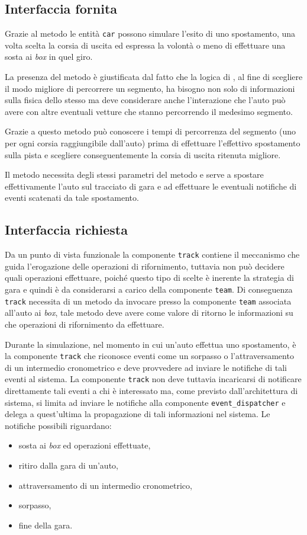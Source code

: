 \subsection*{Interfaccia fornita}
Grazie al metodo  le entità \texttt{car} possono simulare l'esito di uno spostamento, una volta scelta la corsia di uscita ed espressa la volontà o meno di effettuare una sosta ai \textit{box} in quel giro.

La presenza del metodo  è giustificata dal fatto che la logica di , al fine di scegliere il modo migliore di percorrere un segmento, ha bisogno non solo di informazioni sulla fisica dello stesso ma deve considerare anche l'interazione che l'auto può avere con altre eventuali vetture che stanno percorrendo il medesimo segmento.

Grazie a questo metodo  può conoscere i tempi di percorrenza del segmento (uno per ogni corsia raggiungibile dall'auto) prima di effettuare l'effettivo spostamento sulla pista e scegliere conseguentemente la corsia di uscita ritenuta migliore.

Il metodo  necessita degli stessi parametri del metodo  e serve a spostare effettivamente l'auto sul tracciato di gara e ad effettuare le eventuali notifiche di eventi scatenati da tale spostamento.

\subsection*{Interfaccia richiesta}
Da un punto di vista funzionale la componente \texttt{track} contiene il meccanismo che guida l'erogazione delle operazioni di rifornimento, tuttavia non può decidere quali operazioni effettuare, poiché questo tipo di scelte è inerente la strategia di gara e quindi è da considerarsi a carico della componente \texttt{team}. Di conseguenza \texttt{track} necessita di un metodo  da invocare presso la componente \texttt{team} associata all'auto ai \textit{box}, tale metodo deve avere come valore di ritorno le informazioni su che operazioni di rifornimento da effettuare.

Durante la simulazione, nel momento in cui un'auto effettua uno spostamento, è la componente \texttt{track} che riconosce eventi come un sorpasso o l'attraversamento di un intermedio cronometrico e deve provvedere ad inviare le notifiche di tali eventi al sistema. La componente \texttt{track} non deve tuttavia incaricarsi di notificare direttamente tali eventi a chi è interessato ma, come previsto dall'architettura di sistema, si limita ad inviare le notifiche alla componente \texttt{event\_dispatcher} e delega a quest'ultima la propagazione di tali informazioni nel sistema.
Le notifiche possibili riguardano:
\begin{itemize}
\item sosta ai \textit{box} ed operazioni effettuate,
\item ritiro dalla gara di un'auto,
\item attraversamento di un intermedio cronometrico,
\item sorpasso,
\item fine della gara.
\end{itemize}

